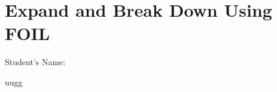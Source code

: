\documentclass[12pt, a4paper, addpoints]{exam}
\newcommand{\ps}{\vspace{36mm}}
\newcommand{\uugg}{%
    \pgfmathtruncatemacro{\a}{random(2,9)} %
    \pgfmathtruncatemacro{\b}{random(2,9)} %
    \edef\result{(x + 1)(\a x + \b)}%
    \result
}
\begin{document}
\section*{Expand and Break Down Using FOIL}
\quad Student's Name: \underline{\hspace{5cm}}

\begin{questions}
\LARGE

\question
uugg
\setlength{\columnsep}{20pt}
\begin{multicols}{3}
\begin{parts}
    \part \( \uugg \)
    \ps
       \part \( \uugg \)
    \ps
       \part \( \uugg \)
    \ps
       \part \( \uugg \)
    \ps
       \part \( \uugg \)
    \ps
       \part \( \uugg \)
    \ps
       \part \( \uugg \)
    \ps
       \part \( \uugg \)
    \ps
       \part \( \uugg \)
    \ps
           \part \( \uugg \)
    \ps
           \part \( \uugg \)
    \ps

\end{parts}
\end{multicols}
\end{questions}
\end{document}

